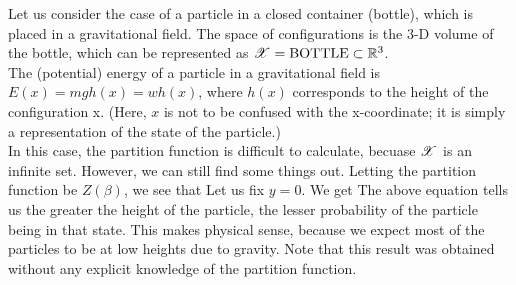 \documentclass[letterpaper,english,12pt]{article}
\begin{document}
\begin{shaded*} \begin{exmp}
Let us consider the case of a particle in a closed container (bottle), which is placed in a gravitational field. The space of configurations is the 3-D volume of the bottle, which can be represented as $\mathscr{X}=\text{BOTTLE}\subset \mathbb{R}^3$. \\
The (potential) energy of a particle in a gravitational field is $E(x)=mg h(x)=w h(x)$, where $h(x)$ corresponds to the height of the configuration x. (Here, $x$ is not to be confused with the x-coordinate; it is simply a representation of the state of the particle.) \\
In this case, the partition function is difficult to calculate, becuase $\mathscr{X}$ is an infinite set. However, we can still find some things out. Letting the partition function be $Z(\beta)$, we see that
Let us fix $y=0$. We get 
The above equation tells us the greater the height of the particle, the lesser probability of the particle being in that state. This makes physical sense, because we expect most of the particles to be at low heights due to gravity. Note that this result was obtained without any explicit knowledge of the partition function. 
\end{exmp} \end{shaded*}
\end{document}
